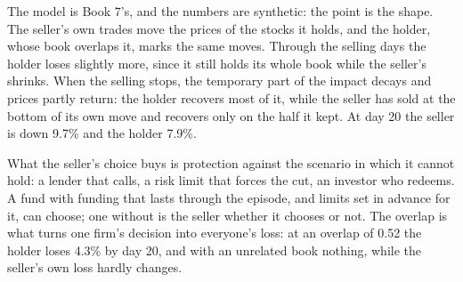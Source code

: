 \begin{omfigure}
\par
{}\label{fig:fm:case-studies-i:august}
\end{omfigure}

The model is Book 7's, and the numbers are synthetic: the point is the shape. The seller's own trades move the prices of the stocks it holds, and
the holder, whose book overlaps it, marks the same moves. Through the selling days the holder loses slightly more, since it still holds its whole
book while the seller's shrinks. When the selling stops, the temporary part of the impact decays and prices partly return: the holder recovers most
of it, while the seller has sold at the bottom of its own move and recovers only on the half it kept. At day 20 the seller is down 9.7\% and the
holder 7.9\%.

What the seller's choice buys is protection against the scenario in which it cannot hold: a lender that calls, a risk limit that forces the cut, an
investor who redeems. A fund with funding that lasts through the episode, and limits set in advance for it, can choose; one without is the seller
whether it chooses or not. The overlap is what turns one firm's decision into everyone's loss: at an overlap of 0.52 the holder loses 4.3\% by day 20,
and with an unrelated book nothing, while the seller's own loss hardly changes.

